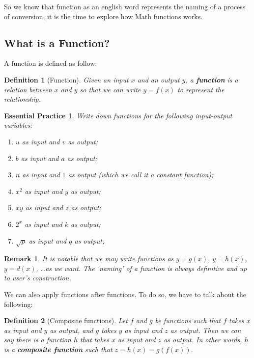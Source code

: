 \documentclass[12pt]{article}
\newtheorem{definition}{Definition}[section]
\newtheorem*{remark}{Remark}
\newtheorem{exercise}{Essential Practice}[subsection]
\begin{document}
    So we know that function as an english word represents the naming of a process of conversion, it is the time to explore how Math functions works.

    \subsection{What is a Function?}

    A function is defined as follow:

    \begin{definition}[Function]
        Given an input $x$ and an output $y$, a \textbf{function} is a relation between $x$ and $y$ so that we can write $y=f(x)$ to represent the relationship. 
    \end{definition}

    \begin{exercise}
        Write down functions for the following input-output variables:\begin{enumerate}
            \item $u$ as input and $v$ as output;
            \item $b$ as input and $a$ as output;
            \item $n$ as input and $1$ as output (which we call it a constant function);
            \item $x^2$ as input and $y$ as output;
            \item $xy$ as input and $z$ as output;
            \item $2^x$ as input and $k$ as output;
            \item $\sqrt{p}$ as input and $q$ as output;
        \end{enumerate}
    \end{exercise}

    \begin{remark}
        It is notable that we may write functions as $y=g(x)$, $y=h(x)$, $y=d(x)$, \dots as we want. The `naming' of a function is always definitive and up to user's construction.
    \end{remark}

    We can also apply functions after functions. To do so, we have to talk about the following:

    \begin{definition}[Composite functions]
        Let $f$ and $g$ be functions such that $f$ takes $x$ as input and $y$ as output, and $g$ takes $y$ as input and $z$ as output. Then we can say there is a function $h$ that takes $x$ as input and $z$ as output. In other words, $h$ is a \textbf{composite function} such that $z=h(x)=g(f(x))$.
    \end{definition}
\end{document}
